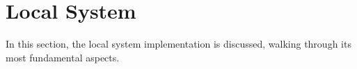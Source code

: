 \section{Local System}
\label{sec:local-system-1}
In this section, the local system implementation is discussed, walking through
its most fundamental aspects.


